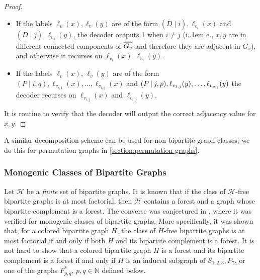 \documentclass{article}
\makeatletter
\newcommand\eqLabelSep{\mathbin|}
\newcommand{\cH}{\ensuremath{\mathcal{H}}}
\newcommand{\cQ}{\ensuremath{\mathcal{Q}}}
\newcommand\splitaftercomma[1]{%
  \begingroup
  \begingroup\lccode`~=`, \lowercase{\endgroup
    \edef~{\mathchar\the\mathcode`, \penalty0 \noexpand\hspace{0pt plus .25em}}%
  }\mathcode`,="8000 #1%
  \endgroup
}
\newcommand*\ie{i.\kern.1em e.\@\xspace} %
\newcommand\doverline[1]{%
  \setbox0=\hbox{$\!\overline{#1}\!$}%
  \ht0=\dimexpr\ht0-.2ex\relax%
  \,\overline{\copy0}\,%
}
\newcommand{\bc}[1]{\doverline{#1}} %
\makeatother
\begin{document}
\begin{proof}
\begin{itemize}
\item If the labels $\ell_v(x),\ell_v(y)$ are of the form $(\overline D \eqLabelSep i), \ell_{v_i}(x)$ and
$(\overline D \eqLabelSep j), \ell_{v_j}(y)$, the decoder outputs 1 when $i \neq j$ (\ie, $x,y$ are in different connected
components of $\bc{G_v}$ and therefore they are adjacent in $G_v$), and otherwise it
recurses on $\ell_{v_i}(x), \ell_{v_i}(y)$.

\item If the labels $\ell_v(x)$, $\ell_v(y)$ are of the form $(P \eqLabelSep i, q), \ell_{v_{i,1}}(x), \dotsc, \ell_{v_{i,q}}(x)$
and $\splitaftercomma{(P \eqLabelSep j, p), \ell_{v_{1,j}}(y), \dotsc, \ell_{v_{p,j}}(y)}$ the decoder recurses on 
$\ell_{v_{i,j}}(x)$ and $\ell_{v_{i,j}}(y)$.
\end{itemize}
It is routine to verify that the decoder will output the correct adjacency value for $x,y$.
\end{proof}


\begin{remark}[$(\cQ,k)$-tree for general graphs]
A similar decomposition scheme can be used for non-bipartite graph classes; we do this for
permutation graphs in \cref{section:permutation graphs}.
\end{remark}




\subsubsection{Monogenic Classes of Bipartite Graphs}
\label{sec:mono-bip-graph-families}

Let $\cH$ be a \emph{finite} set of bipartite graphs. It is known \cite{All09} that if the class of
$\cH$-free bipartite graphs is at most factorial, then $\cH$ contains a forest and a graph whose bipartite complement is a forest. The converse was conjectured in \cite{LZ17}, where it was verified for monogenic classes of bipartite graphs. More specifically, 
it was shown that, for a colored bipartite graph $H$, the class of $H$-free bipartite graphs is at most factorial if and only if both $H$ and its bipartite complement is a forest.  
It is not hard to show that a colored bipartite graph $H$ is a forest and its bipartite complement is
a forest if and only if $H$ is an induced subgraph of $S_{1,2,3}, P_7$, or one of the graphs $F_{p,q}^*$, $p,q \in \mathbb{N}$ defined below.
\end{document}
